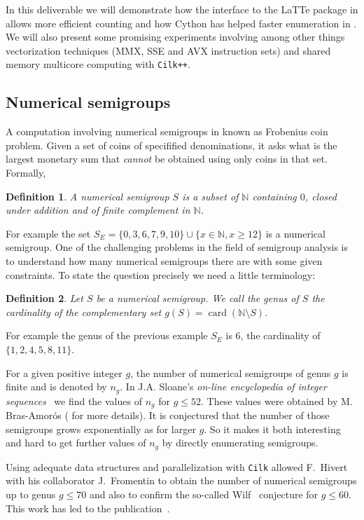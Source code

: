 \documentclass{deliverablereport}
\newcommand{\Cilk}{\texttt{Cilk}\xspace}
\newcommand{\CilkP}{\texttt{Cilk++}\xspace}
\newcommand{\NN}{\mathbb{N}}
\newtheorem{defi}{Definition}
\begin{document}
In this deliverable we will demonstrate how the interface to the LaTTe package
in \Sage allows more efficient counting and how Cython has helped faster enumeration
in \Sage. We will also present some promising experiments involving among
other things vectorization techniques (MMX, SSE and AVX instruction sets) and
shared memory multicore computing with \CilkP.

\subsection{Numerical semigroups}

A computation involving numerical semigroups in known as Frobenius coin
problem.  Given a set of coins of specifified denominations, it asks what is
the largest monetary sum that {\em cannot} be obtained using only coins in that
set. Formally,
\begin{defi}
  A \emph{numerical semigroup} $S$ is a subset of $\NN$ containing $0$, closed
  under addition and of finite complement in $\NN$.
\end{defi}
For example the set $S_E=\{0,3,6,7,9,10\}\cup\{x\in\NN, x\geq 12\}$
is a numerical semigroup. One of the challenging problems in the field of
semigroup analysis is to understand how many numerical semigroups there are with some
given constraints. To state the question precisely we need a little
terminology:
\begin{defi}
  Let $S$ be a numerical semigroup. We call the \emph{genus} of $S$ the
  cardinality of the complementary set $g(S)=\operatorname{card}(\NN\setminus
  S)$.
\end{defi}
For example the genus of the previous example $S_E$ is $6$, the cardinality of
$\{1,2,4,5,8,11\}$.

For a given positive integer $g$, the number of numerical semigroups of genus
$g$ is finite and is denoted by $n_g$. In J.A. Sloane's \emph{on-line
encyclopedia of integer sequences}~\cite{OEIS} we find the values of $n_g$
for $g\leq 52$. These values were obtained by M. Bras-Amor\'os
(\cite{BrasAmoros2008} for more details). It is conjectured that the number of
those semigroups grows exponentially as for larger $g$. So it makes it both interesting and hard
to get further values of $n_g$ by directly enumerating semigroups.

Using adequate data structures and parallelization with \Cilk allowed
F.~Hivert with his collaborator J.~Fromentin to obtain the number of numerical
semigroups up to genus $g \leq 70$ and also to confirm the so-called
Wilf~\cite{Wilf} conjecture
for $g \leq 60$. This work has led to the
publication~\cite{FromentinH16}.
\end{document}

